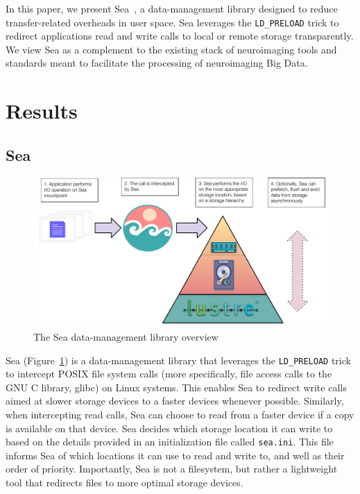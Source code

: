 \documentclass[fleqn,10pt]{wlscirep}
\begin{document}
    In this paper, we present Sea~\cite{hayot2022sea}, a data-management library designed to reduce
    transfer-related overheads in user space. Sea leverages the \texttt{LD\_PRELOAD} trick to redirect applications read and write calls to 
    local or remote storage transparently. We view Sea as a complement
    to the existing stack of neuroimaging tools and standards meant to facilitate 
    the processing of neuroimaging Big Data.   
    
    
    
    
    
    \section{Results}

    \subsection{Sea}
    
\begin{figure}

    \centering
    \includegraphics[width=\columnwidth]{figures/sea-diagram.pdf}%
\caption{The Sea data-management library overview}
\label{fig:seaneuro:diagram}
\end{figure}
    Sea (Figure~\ref{fig:seaneuro:diagram}) is a data-management library that leverages
    the \texttt{LD\_PRELOAD}
    trick to intercept POSIX file system calls (more specifically, file access calls to the GNU C library,
    glibc) on Linux systems. This enables Sea to redirect write calls
    aimed at slower storage devices to a faster devices whenever possible.
    Similarly, when intercepting read calls, Sea can choose to read from a
    faster device if a copy is available on that device. Sea decides which
    storage location it can write to based on the details provided in an
    initialization file called \texttt{sea.ini}. This file informs Sea of which
    locations it can use to read and write to, and well as their order of
    priority. Importantly, Sea is not a filesystem, but rather a
    lightweight tool that redirects files to more optimal storage devices.
\end{document}
